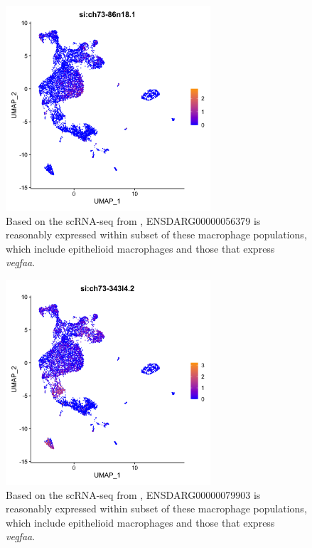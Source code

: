 \begin{figure}
\centering
\includegraphics[height=3in]{images/wtCombo_si:ch73-86n18.1_GEPlot.png
}
\caption[Single-cell RNA-seq expression profile for 56379]{Based on the scRNA-seq from \citet{Cronan2021}, ENSDARG00000056379 is reasonably expressed within subset of these macrophage populations, which include epithelioid macrophages and those that express \textit{vegfaa}.}
\label{figure:sc56379}
\end{figure}

\begin{figure}
\centering
\includegraphics[height=3in]{images/wtCombo_si:ch73-343l4.2_GEPlot.png
}
\caption[Single-cell RNA-seq expression profile for 79903]{Based on the scRNA-seq from \citet{Cronan2021}, ENSDARG00000079903 is reasonably expressed within subset of these macrophage populations, which include epithelioid macrophages and those that express \textit{vegfaa}.}
\label{figure:sc79903}
\end{figure}

